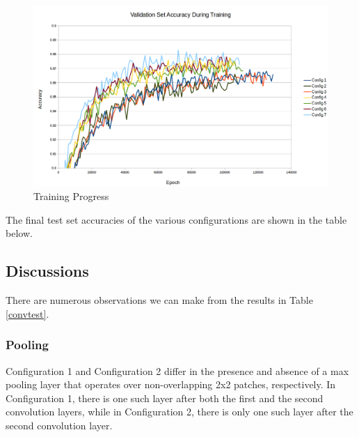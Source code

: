 \documentclass{article} %
\begin{document}
\begin{figure}[h]
\caption{Training Progress}
\label{convplot}
\centering
\includegraphics[width=1\textwidth]{plots/convplot}
\end{figure}

The final test set accuracies of the various configurations are shown in the table below. 

\begin{table}[h]
\centering
\caption{Test Set Accuracies}
\label{convtest}
\end{table}


\subsection{Discussions}

There are numerous observations we can make from the results in Table \ref{convtest}. 

\subsubsection{Pooling}

Configuration 1 and Configuration 2 differ in the presence and absence of a max pooling layer that operates over non-overlapping 2x2 patches, respectively. In Configuration 1, there is one such layer after both the first and the second convolution layers, while in Configuration 2, there is only one such layer after the second convolution layer. 
\end{document}
